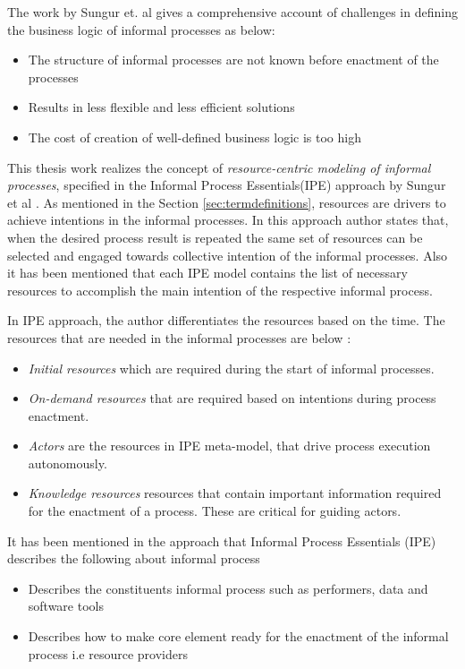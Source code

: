 The work by Sungur et. al \cite{Sungur2014a} gives a comprehensive account of challenges in defining the business logic of informal processes as below:

\begin{itemize}
	\item The structure of informal processes are not known before enactment of the processes
	\item Results in less flexible and less efficient solutions
	\item The cost of creation of well-defined business logic is too high
\end{itemize}

This thesis work realizes the concept of \textit{resource-centric modeling of informal processes}, specified in the Informal Process Essentials(IPE) approach by Sungur et al \cite{Sungur2014a}.  As mentioned in the Section \ref{sec:termdefinitions}, resources are drivers to achieve intentions in the informal processes. In this approach author states that, when the desired process result is repeated the same set of resources can be selected and engaged towards collective intention of the informal processes. Also it has been mentioned that each IPE model contains the list of necessary resources to accomplish the main intention of the respective informal process.

In IPE approach, the author differentiates the resources based on the time. The resources that are needed in the informal processes are below :
  \begin{itemize}
  	\item \textit{Initial resources} which are required during the start of informal processes.
  	\item \textit{On-demand resources} that are required based on intentions during process enactment.
  	\item \textit{Actors} are the resources in IPE meta-model, that drive process execution autonomously.
  	\item \textit{Knowledge resources} resources that contain important information required for the enactment of a process. These are critical for guiding actors.  
  \end{itemize}
 
It has been mentioned in the approach \cite{Sungur2014} that Informal Process Essentials (IPE) describes the following about informal process  

\begin{itemize}
	\item Describes the constituents informal process such as performers, data and software tools
	\item Describes how to make core element ready for the enactment of the informal process i.e resource providers
\end{itemize}

